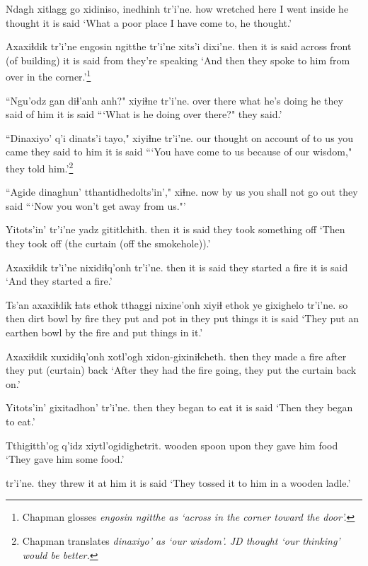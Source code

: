 \documentclass[12pt]{article}
\begin{document}
\gll Ndagh xitlagg go xidiniso, inedhinh tr'i'ne.
how  wretched here {I went inside} {he thought} {it is said}
\glt `What a poor place I have come to, he thought.'
\glend

\gll Axaxiɬdik tr'i'ne engosin ngitthe tr'i'ne xits'i dixi'ne.
then  {it is said} across  {front (of building)} {it is said} from {they're speaking}
\glt `And then they spoke to him from over in the corner.'\footnote{Chapman glosses \em engosin ngitthe \em as `across in the corner toward the door'.}
\glend

\gll ``Ngu'odz gan diɬ'anh anh?" xiyiɬne  tr'i'ne.
{over there} what {he's doing} he  {they said of him} {it is said}
\glt ```What is he doing over there?" they said.'
\glend

\gll ``Dinaxiyo' q'i dinats'i tayo," xiyiɬne  tr'i'ne.
{our thought} {on account of} {to us} {you came} {they said to him} {it is said}
\glt ```You have come to us because of our wisdom," they told him.'\footnote{Chapman translates \em dinaxiyo' \em as `our wisdom'. JD thought `our thinking' would be better.}
\glend

\gll ``Agide dinaghun' {tthantidhedolts'in',"} xiɬne.
now  {by us} {you shall not go out}  {they said}
\glt ```Now you won't get away from us."'
\glend

\gll Yitots'in' tr'i'ne {yadz gititlchith.}
then  {it is said} {they took something off }
\glt `Then they took off (the curtain (off the smokehole)).'
\glend

\gll Axaxiɬdik tr'i'ne nixidiɬq'onh tr'i'ne.
then  {it is said} {they started a fire} {it is said}
\glt `And they started a fire.'
\glend

\gll Ts'an axaxiɬdik ɬats ethok tthaggi nixine'onh xiyiɬ ethok ye gixighelo  tr'i'ne.
so then  dirt bowl {by fire} {they put} and pot in {they put things} {it is said}
\glt `They put an earthen bowl by the fire and put things in it.'
\glend

\gll Axaxiɬdik xuxidiɬq'onh xotl'ogh xidon-gixiniɬcheth.
then  {they made a fire} after {they put (curtain) back}
\glt `After they had the fire going, they put the curtain back on.'
\glend

\gll Yitots'in' gixitadhon'  tr'i'ne.
then {they began to eat} {it is said}
\glt `Then they began to eat.'
\glend

\gll Tthigitth'og q'idz xiytl'ogidighetrit.
{wooden spoon} upon {they gave him food}
\glt `They gave him some food.'
\glend

 tr'i'ne.
{they threw it at him}  {it is said}
\glt `They tossed it to him in a wooden ladle.'
\glend
\end{document}
